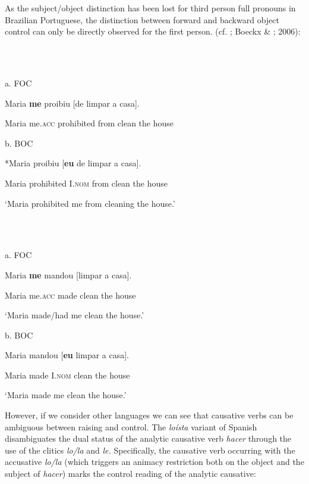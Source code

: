 \documentclass[output=paper]{langsci/langscibook}
\begin{document}
As the subject/object distinction has been lost for third person full pronouns in Brazilian Portuguese, the distinction between forward and backward object control can only be directly observed for the first person. (cf. \citealt{Farrell1995}; Boeckx \& \citealt{Hornstein2004}; 2006):

\ea%
    \label{ex:moreno:5}
    \gll\\
        \\
    \glt
    \z

          a.   FOC

Maria \textbf{me}         proibiu      [de      limpar a    casa].    

  Maria me.\textsc{acc}  prohibited from   clean   the house

b.  BOC

*Maria proibiu   [\textbf{eu}       de    limpar a   casa].    

    Maria   prohibited   I.\textsc{nom}  from clean  the house

    ‘Maria prohibited me from cleaning the house.’

\ea%
    \label{ex:moreno:6}
    \gll\\
        \\
    \glt
    \z

          a.  FOC

Maria  \textbf{me}        mandou  [limpar a    casa].      

    Maria  me.\textsc{acc} made       clean   the house

    ‘Maria made/had me clean the house.’

b.  BOC

Maria mandou [\textbf{eu}        limpar a   casa].      

    Maria made       I.\textsc{nom}  clean  the house

‘Maria made me clean the house.’

However, if we consider other languages we can see that causative verbs can be ambiguous between raising and control. The \textit{loísta} variant of Spanish disambiguates the dual status of the analytic causative verb \textit{hacer} through the use of the clitics \textit{lo/la} and \textit{le.} Specifically, the causative verb occurring with the accusative \textit{lo/la} (which triggers an animacy restriction both on the object and the subject of \textit{hacer}) marks the control reading of the analytic causative:

\ea%
    \label{ex:moreno:7}
    \gll\\
        \\
    \glt
    \z
\end{document}
